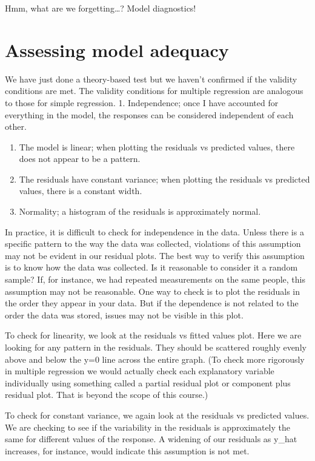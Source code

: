 \documentclass[
]{book}
\begin{document}
Hmm, what are we forgetting\ldots? Model diagnostics!

\hypertarget{assessing-model-adequacy}{%
\section{Assessing model adequacy}\label{assessing-model-adequacy}}

We have just done a theory-based test but we haven't confirmed if the validity conditions are met. The validity conditions for multiple regression are analogous to those for simple regression.
1. Independence; once I have accounted for everything in the model, the responses can be considered independent of each other.

\begin{enumerate}
\def\labelenumi{\arabic{enumi}.}
\setcounter{enumi}{1}
\item
  The model is linear; when plotting the residuals vs predicted values, there does not appear to be a pattern.
\item
  The residuals have constant variance; when plotting the residuals vs predicted values, there is a constant width.
\item
  Normality; a histogram of the residuals is approximately normal.
\end{enumerate}

In practice, it is difficult to check for independence in the data. Unless there is a specific pattern to the way the data was collected, violations of this assumption may not be evident in our residual plots. The best way to verify this assumption is to know how the data was collected. Is it reasonable to consider it a random sample? If, for instance, we had repeated measurements on the same people, this assumption may not be reasonable. One way to check is to plot the residuals in the order they appear in your data. But if the dependence is not related to the order the data was stored, issues may not be visible in this plot.

To check for linearity, we look at the residuals vs fitted values plot. Here we are looking for any pattern in the residuals. They should be scattered roughly evenly above and below the y=0 line across the entire graph. (To check more rigorously in multiple regression we would actually check each explanatory variable individually using something called a partial residual plot or component plus residual plot. That is beyond the scope of this course.)

To check for constant variance, we again look at the residuals vs predicted values. We are checking to see if the variability in the residuals is approximately the same for different values of the response. A widening of our residuals as y\_hat increases, for instance, would indicate this assumption is not met.
\end{document}
